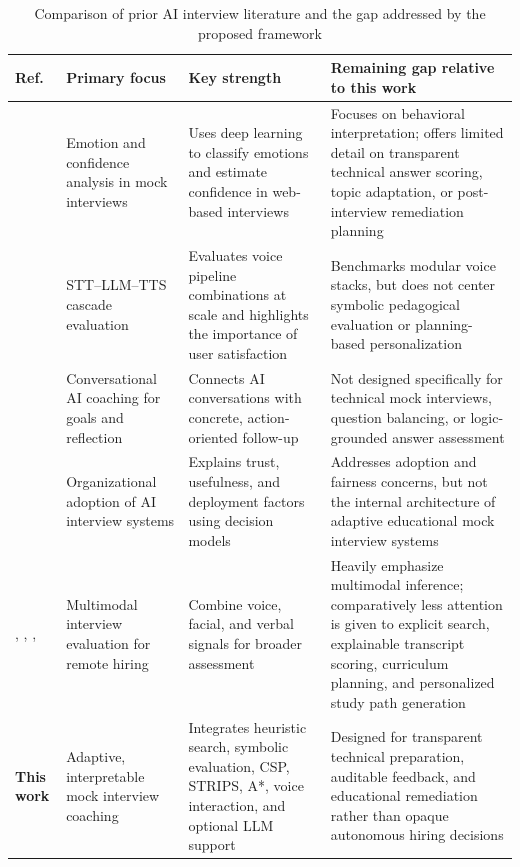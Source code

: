 \documentclass[conference]{IEEEtran}
\begin{document}
\begin{table}[t]
\centering
\caption{Comparison of prior AI interview literature and the gap addressed by the proposed framework}
\label{tab:lit_compare}
\small
\begin{tabular}{L{0.8cm}L{2.6cm}L{4.2cm}L{7.2cm}}
\toprule
\textbf{Ref.} & \textbf{Primary focus} & \textbf{Key strength} & \textbf{Remaining gap relative to this work} \\
\midrule
\cite{r1} & Emotion and confidence analysis in mock interviews & Uses deep learning to classify emotions and estimate confidence in web-based interviews & Focuses on behavioral interpretation; offers limited detail on transparent technical answer scoring, topic adaptation, or post-interview remediation planning \\
\cite{r2} & STT--LLM--TTS cascade evaluation & Evaluates voice pipeline combinations at scale and highlights the importance of user satisfaction & Benchmarks modular voice stacks, but does not center symbolic pedagogical evaluation or planning-based personalization \\
\cite{r3} & Conversational AI coaching for goals and reflection & Connects AI conversations with concrete, action-oriented follow-up & Not designed specifically for technical mock interviews, question balancing, or logic-grounded answer assessment \\
\cite{r4} & Organizational adoption of AI interview systems & Explains trust, usefulness, and deployment factors using decision models & Addresses adoption and fairness concerns, but not the internal architecture of adaptive educational mock interview systems \\
\cite{r5}, \cite{r6}, \cite{r7}, \cite{r8} & Multimodal interview evaluation for remote hiring & Combine voice, facial, and verbal signals for broader assessment & Heavily emphasize multimodal inference; comparatively less attention is given to explicit search, explainable transcript scoring, curriculum planning, and personalized study path generation \\
\textbf{This work} & Adaptive, interpretable mock interview coaching & Integrates heuristic search, symbolic evaluation, CSP, STRIPS, A*, voice interaction, and optional LLM support & Designed for transparent technical preparation, auditable feedback, and educational remediation rather than opaque autonomous hiring decisions \\
\bottomrule
\end{tabular}
\end{table}
\end{document}
